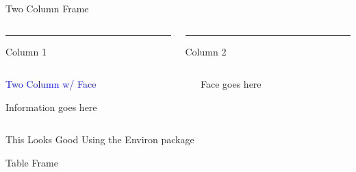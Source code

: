 \documentclass[notes,11pt, aspectratio=169]{beamer}
\begin{document}
\begin{frame}{Two Column Frame}
\begin{columns}[T] %
\begin{column}{.58\textwidth}
\color{red}\rule{\linewidth}{4pt}
Column 1
\end{column}%
\hfill%
\begin{column}{.38\textwidth}
\color{blue}\rule{\linewidth}{4pt}
Column 2
\end{column}%
\end{columns}
\end{frame}

\begin{frame}
  \vspace{-8pt}
\begin{columns}[T] %
\begin{column}{.58\textwidth}
\begin{minipage}[t][\textheight][t]
  {\dimexpr\textwidth}
  \vspace{8pt}
  \hspace{4pt} \textcolor{blue}{Two Column w/ Face}
  \vspace{8pt}
  
Information goes here
    \end{minipage}
\end{column}%
\hfill%
\begin{column}{.42\textwidth}
 \colorbox{green!20}{\begin{minipage}[t][1.2\textheight][t]
      {\dimexpr\textwidth}
      Face goes here
    \end{minipage}}
\end{column}%
\end{columns}
\end{frame}

\begin{videoframe}{This Looks Good}
  Using the Environ package
\end{videoframe}

\begin{frame}{Table Frame}
\end{frame}
\end{document}
